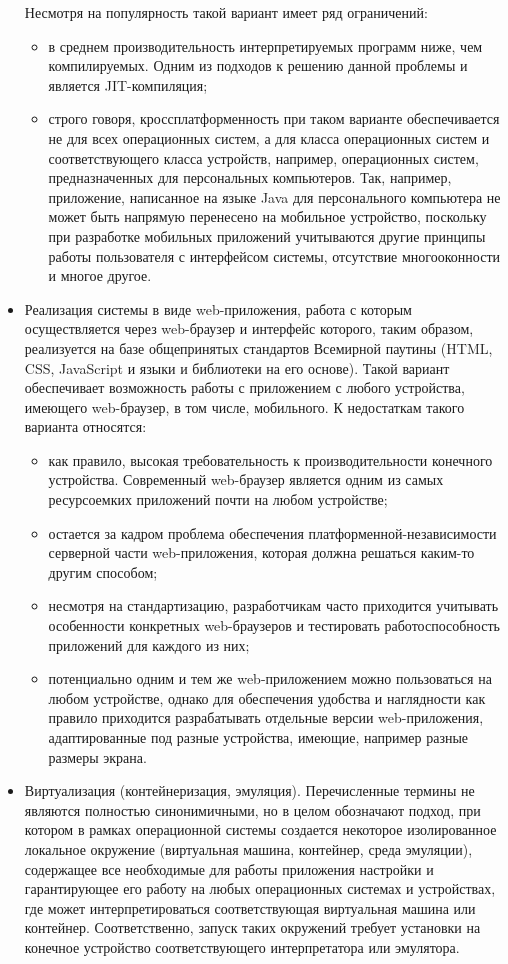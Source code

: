 \begin{itemize}
	Несмотря на популярность такой вариант имеет ряд ограничений:
	\begin{itemize}
		\item в среднем производительность интерпретируемых программ ниже, чем компилируемых. Одним из подходов к решению данной проблемы и является JIT-компиляция;
		\item строго говоря, кроссплатформенность при таком варианте обеспечивается не для всех операционных систем, а для класса операционных систем и соответствующего класса устройств, например, операционных систем, предназначенных для персональных компьютеров. Так, например, приложение, написанное на языке Java для персонального компьютера не может быть напрямую перенесено на мобильное устройство, поскольку при разработке мобильных приложений учитываются другие принципы работы пользователя с интерфейсом системы, отсутствие многооконности и многое другое.
	\end{itemize}
	\item Реализация системы в виде web-приложения, работа с которым осуществляется через web-браузер и интерфейс которого, таким образом, реализуется на базе общепринятых стандартов Всемирной паутины (HTML, CSS, JavaScript и языки и библиотеки на его основе). Такой вариант обеспечивает возможность работы с приложением с любого устройства, имеющего web-браузер, в том числе, мобильного. К недостаткам такого варианта относятся:
	\begin{itemize}
		\item как правило, высокая требовательность к производительности конечного устройства. Современный web-браузер является одним из самых ресурсоемких приложений почти на любом устройстве;
		\item остается за кадром проблема обеспечения платформенной-независимости серверной части web-приложения, которая должна решаться каким-то другим способом;
		\item несмотря на стандартизацию, разработчикам часто приходится учитывать особенности конкретных web-браузеров и тестировать работоспособность приложений для каждого из них;
		\item потенциально одним и тем же web-приложением можно пользоваться на любом устройстве, однако для обеспечения удобства и наглядности как правило приходится разрабатывать отдельные версии web-приложения, адаптированные под разные устройства, имеющие, например разные размеры экрана.
	\end{itemize}
	\item Виртуализация (контейнеризация, эмуляция). Перечисленные термины не являются полностью синонимичными, но в целом обозначают подход, при котором в рамках операционной системы создается некоторое изолированное локальное окружение (виртуальная машина, контейнер, среда эмуляции), содержащее все необходимые для работы приложения настройки и гарантирующее его работу на любых операционных системах и устройствах, где может интерпретироваться соответствующая виртуальная машина или контейнер. Соответственно, запуск таких окружений требует установки на конечное устройство соответствующего интерпретатора или эмулятора.
	

\end{itemize}
